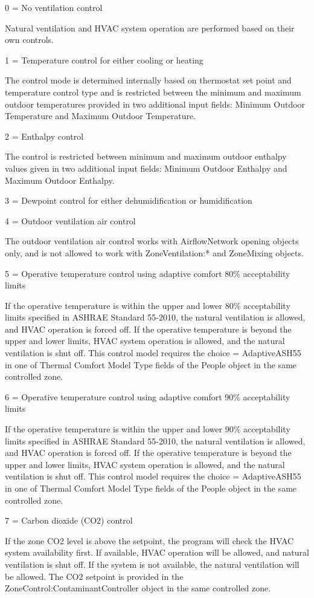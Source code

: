 \begin{description}
  \item
  0 = No ventilation control
  
  Natural ventilation and HVAC system operation are performed based on their own controls.
  \item
  1 = Temperature control for either cooling or heating
  
  The control mode is determined internally based on thermostat set point and temperature control type and is restricted between the minimum and maximum outdoor temperatures provided in two additional input fields: Minimum Outdoor Temperature and Maximum Outdoor Temperature.
  \item
  2 = Enthalpy control
  
  The control is restricted between minimum and maximum outdoor enthalpy values given in two additional input fields: Minimum Outdoor Enthalpy and Maximum Outdoor Enthalpy.
  \item
  3 = Dewpoint control for either dehumidification or humidification
  \item
  4 = Outdoor ventilation air control
  
  The outdoor ventilation air control works with AirflowNetwork opening objects only, and is not allowed to work with ZoneVentilation:* and ZoneMixing objects.
  \item
  5 = Operative temperature control using adaptive comfort 80\% acceptability limits
  
  If the operative temperature is within the upper and lower 80\% acceptability limits specified in ASHRAE Standard 55-2010, the natural ventilation is allowed, and HVAC operation is forced off. If the operative temperature is beyond the upper and lower limits, HVAC system operation is allowed, and the natural ventilation is shut off.
  This control model requires the choice = AdaptiveASH55 in one of Thermal Comfort Model Type fields of the People object in the same controlled zone.
  \item
  6 = Operative temperature control using adaptive comfort 90\% acceptability limits
  
  If the operative temperature is within the upper and lower 90\% acceptability limits specified in ASHRAE Standard 55-2010, the natural ventilation is allowed, and HVAC operation is forced off. If the operative temperature is beyond the upper and lower limits, HVAC system operation is allowed, and the natural ventilation is shut off.
  This control model requires the choice = AdaptiveASH55 in one of Thermal Comfort Model Type fields of the People object in the same controlled zone.
  \item
  7 = Carbon dioxide (CO2) control
   
  If the zone CO2 level is above the setpoint, the program will check the HVAC system availability first. If available, HVAC operation will be allowed, and natural ventilation is shut off. If the system is not available, the natural ventilation will be allowed.
  The CO2 setpoint is provided in the ZoneControl:ContaminantController object in the same controlled zone.
\end{description}


